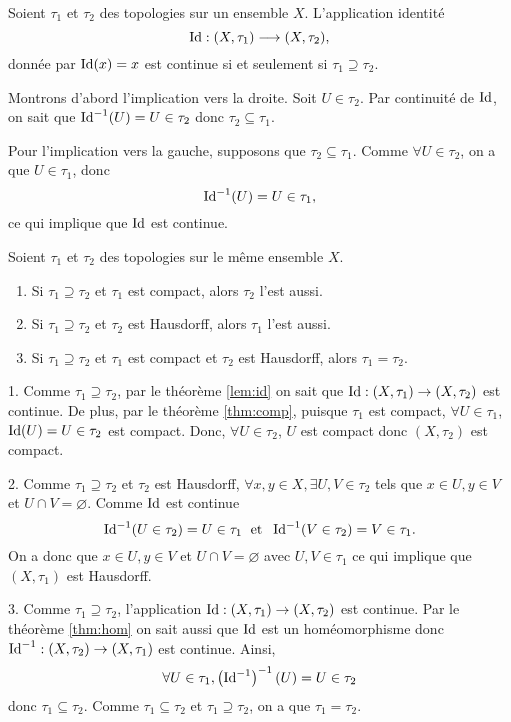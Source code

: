 \documentclass[french]{article}
\begin{document}
\begin{lemme}\label{lem:id}
  Soient $\tau_1$ et $\tau_2$ des topologies sur un ensemble $X$. L'application identité
  $$\operatorname{Id}: (X, \tau_1) \longrightarrow (X, \tau_2),$$
  donnée par $\operatorname{Id}(x) = x$ est continue si et seulement si $\tau_1 \supseteq \tau_2$.

  \tcblower
  \begin{preuve}
    Montrons d'abord l'implication vers la droite. Soit $U \in \tau_2$. Par continuité de $\operatorname{Id}$, on sait que $\operatorname{Id}^{-1}(U) = U \in \tau_2$ donc $\tau_2 \subseteq \tau_1$.
    \par Pour l'implication vers la gauche, supposons que $\tau_2 \subseteq \tau_1$. Comme $\forall U \in \tau_2$, on a que $U \in \tau_1$, donc
    $$\operatorname{Id}^{-1}(U) = U \in \tau_1,$$
    ce qui implique que $\operatorname{Id}$ est continue.
  \end{preuve}
\end{lemme}

\begin{theoreme}
  Soient $\tau_1$ et $\tau_2$ des topologies sur le même ensemble $X$.
  \begin{enumerate}
    \item Si $\tau_1 \supseteq \tau_2$ et $\tau_1$ est compact, alors $\tau_2$ l'est aussi.
    \item Si $\tau_1 \supseteq \tau_2$ et $\tau_2$ est Hausdorff, alors $\tau_1$ l'est aussi.
    \item Si $\tau_1 \supseteq \tau_2$ et $\tau_1$ est compact et $\tau_2$ est Hausdorff, alors $\tau_1 = \tau_2$.
  \end{enumerate}

  \tcblower
  \begin{preuve}
    1. Comme $\tau_1 \supseteq \tau_2$, par le théorème \ref{lem:id} on sait que $\operatorname{Id}: (X, \tau_1) \rightarrow (X, \tau_2)$ est continue. De plus, par le théorème \ref{thm:comp}, puisque $\tau_1$ est compact, $\forall U \in \tau_1$, $\operatorname{Id}(U) = U \in \tau_2$ est compact. Donc, $\forall U \in \tau_2$, $U$ est compact donc $(X, \tau_2)$ est compact.
    \par 2. Comme $\tau_1 \supseteq \tau_2$ et $\tau_2$ est Hausdorff, $\forall x, y \in X, \exists U, V \in \tau_2$ tels que $x \in U, y \in V$ et $U \cap V = \varnothing$. Comme $\operatorname{Id}$ est continue
    $$\operatorname{Id}^{-1}(U \in \tau_2) = U \in \tau_1 \; \text{ et } \; \operatorname{Id}^{-1}(V \in \tau_2) = V \in \tau_1.$$
    On a donc que $x\in U, y \in V$ et $U \cap V = \varnothing$ avec $U, V \in \tau_1$ ce qui implique que $(X, \tau_1)$ est Hausdorff.
    \par 3. Comme $\tau_1 \supseteq \tau_2$, l'application $\operatorname{Id}: (X, \tau_1) \rightarrow (X, \tau_2)$ est continue. Par le théorème \ref{thm:hom} on sait aussi que $\operatorname{Id}$ est un homéomorphisme donc $\operatorname{Id}^{-1}: (X, \tau_2) \rightarrow (X, \tau_1)$ est continue. Ainsi,
    $$\forall U \in \tau_1, \left( \operatorname{Id}^{-1} \right)^{-1} (U) = U \in \tau_2$$
    donc $\tau_1 \subseteq \tau_2$. Comme $\tau_1 \subseteq \tau_2$ et $\tau_1 \supseteq \tau_2$, on a que $\tau_1 = \tau_2$.
  \end{preuve}
\end{theoreme}
\end{document}
